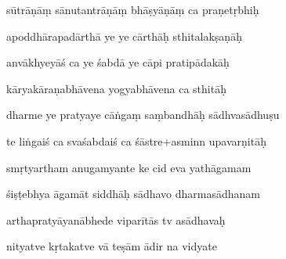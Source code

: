 \documentclass[article,12pt,a4paper]{memoir}%
\newcounter{parCount}
\begin{document}
	  
	  \pstart \leavevmode%
	sūtrāṇāṃ sānutantrāṇāṃ bhāṣyāṇāṃ ca praṇetṛbhiḥ 
	{}
	\pend%
      

	  
	  \pstart {} apoddhārapadārthā ye ye cārthāḥ sthitalakṣaṇāḥ 
	{}
	\pend%
      

	  
	  \pstart \leavevmode%
	anvākhyeyāś ca ye śabdā ye cāpi pratipādakāḥ 
	{}
	\pend%
      

	  
	  \pstart {} kāryakāraṇabhāvena yogyabhāvena ca sthitāḥ 
	{}
	\pend%
      

	  
	  \pstart \leavevmode%
	dharme ye pratyaye cāṅgaṃ saṃbandhāḥ sādhvasādhuṣu 
	{}
	\pend%
      

	  
	  \pstart {} te liṅgaiś ca svaśabdaiś ca śāstre+asminn upavarṇitāḥ 
	{}
	\pend%
      

	  
	  \pstart \leavevmode%
	smṛtyartham anugamyante ke cid eva yathāgamam 
	{}
	\pend%
      

	  
	  \pstart {} śiṣṭebhya āgamāt siddhāḥ sādhavo dharmasādhanam 
	{}
	\pend%
      

	  
	  \pstart \leavevmode%
	arthapratyāyanābhede viparītās tv asādhavaḥ 
	{}
	\pend%
      

	  
	  \pstart {} nityatve kṛtakatve vā teṣām ādir na vidyate 
	{}
	\pend%
      
\end{document}

